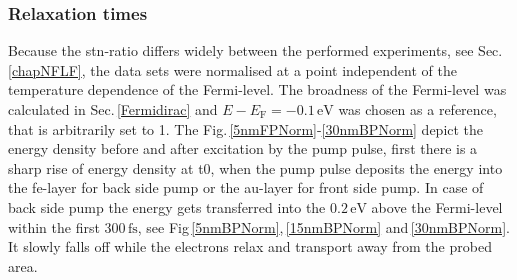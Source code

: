 \documentclass[a4paper,12pt,twoside]{article}
\begin{document}
\subsubsection{Relaxation times}
    \label{chapR}
Because the \gls{stn}-ratio differs widely between the performed experiments, see Sec.\,\ref{chapNFLF}, the data sets were normalised at a point independent of the temperature dependence of the Fermi-level. The broadness of the Fermi-level was calculated in Sec.\,\ref{Fermidirac} and $E - E_\mathrm{F} = -0.1\,\mathrm{eV}$ was chosen as a reference, that is arbitrarily set to 1. The Fig.\,\ref{5nmFPNorm}-\ref{30nmBPNorm} depict the energy density before and after excitation by the pump pulse, first there is a sharp rise of energy density at \gls{t0}, when the pump pulse deposits the energy into the \gls{fe}-layer for back side pump or the \gls{au}-layer for front side pump. In case of back side pump the energy gets transferred into the $0.2\,\mathrm{eV}$ above the Fermi-level within the first $300\,\mathrm{fs}$, see Fig\,\ref{5nmBPNorm},\,\ref{15nmBPNorm} and\,\ref{30nmBPNorm}. It slowly falls off while the electrons relax and transport away from the probed area. 
\end{document}
